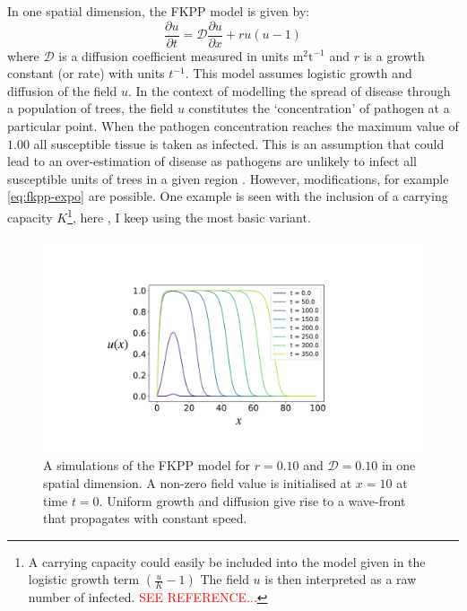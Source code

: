 In one spatial dimension, the FKPP model is given by:
\begin{equation}
\label{eq:fkpp-expo}
    \frac{\partial u}{\partial t} = \mathcal{D}\frac{\partial u}{\partial x} + ru(u - 1)
\end{equation}
where $\mathcal{D}$ is a diffusion coefficient measured in units $\mathrm{m^2 t^{-1}}$ and $r$ is a growth constant (or rate) with units $t^{-1}$. %
This model assumes logistic growth and diffusion of the field $u$. In the context of modelling the spread of disease through a population of trees, the field $u$ constitutes the `concentration' of pathogen at a particular point. %
When the pathogen concentration reaches the maximum value of $1.00$ all susceptible tissue is taken as infected. This is an assumption that could lead to an over-estimation of disease  as pathogens are unlikely to infect all susceptible units of trees in a given region \cite{neher1992underestimation}. %
However,  modifications, for example \ref{eq:fkpp-expo} are possible. One example is seen with the inclusion of a carrying capacity $K$\footnote{A carrying capacity could easily be included into the model given in the logistic growth term $(\frac{u}{K} - 1)$ The field $u$ is then interpreted as a raw number of infected. \textcolor{red}{SEE REFERENCE...}}, here , I keep using   the most basic variant.

\begin{figure}
    \centering
    \includegraphics[scale=0.25]{chapter7/figures/figure1xy.pdf}
    \caption{A simulations of the FKPP model for $r=0.10$ and $\mathcal{D}=0.10$ in one spatial dimension. A non-zero field value is initialised at $x=10$ at time $t=0$. Uniform growth and diffusion give rise to a wave-front that propagates with constant speed.}
    \label{fig:fkpp-expo1D}
\end{figure}


